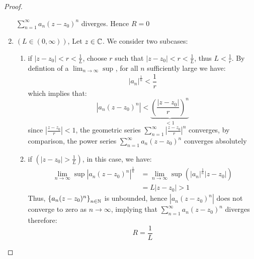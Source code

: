 \begin{proof}
\begin{enumerate}
   $\sum_{n=1}^{\infty} a_n (z-z_0) ^n  $ diverges. Hence $R = 0 $ 
   \item $(L \in  (0, \infty ) )  $, Let $z \in  \mathbb{C}  $. We consider two subcases:
     \begin{enumerate}
     \item if $ \left| z-z_0 \right| < r < \frac{1}{L}$, choose $r $ such that 
       $\left| z-z_0 \right|<  r < \frac{1}{L} $, thus $L < \frac{1}{r} $. By defintion of a $\lim_{n \to \infty} \sup_{}  $,
       for all $n $ sufficiently large we have: 
       \[
       \left| a_n  \right|^{\frac{1}{n}} <  \frac{1}{r}
       \]
       which implies that: 
       \[
       \left| a_n (z-z_0) ^n  \right| <  
       \underbrace{
         \left( 
           \frac{\left| z-z_0 \right|}{r}
         \right)^n 
       }_{<  1} 
       \]
       since $\left| \frac{z-z_0}{r} \right| <  1$, the geometric series $\sum_{n=1}^{\infty} \left| \frac{z-z_0}{r} \right|^n $ converges, by comparison, the power series $\sum_{n=1}^{\infty} a_n (z-z_0) ^n  $ converges absolutely
      \item 
        if $(\left| z-z_0 \right| > \frac{1}{L})  $, in this case, we have:
        \begin{align*}
        \lim_{n \to \infty} \sup_{} 
        \left| a_n (z-z_0) ^n  \right|^{\frac{1}{n}} & = 
        \lim_{n \to \infty} \sup_{} 
        \left( 
          \left| a_n  \right|^{\frac{1}{n}} \left| z-z_0 \right| 
        \right) \\
        &=
        L \left| z-z_0 \right| > 1
        \end{align*}
        Thus, $\left\{ a_n (z-z_0) ^n  \right\}_{n \in  \mathbb{N}} $  is unbounded, hence 
        $\left| a_n (z-z_0) ^n  \right| $  does not converge to zero as $n \rightarrow \infty  $, 
        implying that $\sum_{n=1}^{\infty} a_n (z-z_0) ^n  $  diverges therefore:
        \[
        R = \frac{1}{L}
        \]
     \end{enumerate}
  \end{enumerate}
\end{proof}
